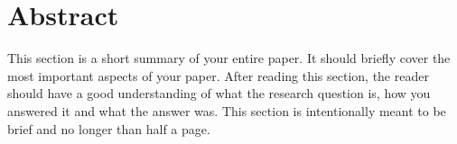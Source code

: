 \documentclass{thesisclass}
\begin{document}
\frontmatter
{}



{}
\clearpage
\tableofcontents


{
\clearpage
{} %
\listoffigures {} 
\clearpage
{} %
\listoftables  {} 
\printnomenclature   {} 
}
{
\clearpage
{} %
\listoffigures {} 
\clearpage
{} %
\listoftables {} 
\printnomenclature {}
}








\mainmatter
{}


\chapter*{Abstract} 
This section is a short summary of your entire paper. It should briefly cover the most important aspects of your paper. After reading this section, the reader should have a good understanding of what the research question is, how you answered it and what the answer was. This section is intentionally meant to be brief and no longer than half a page.

\end{document}
